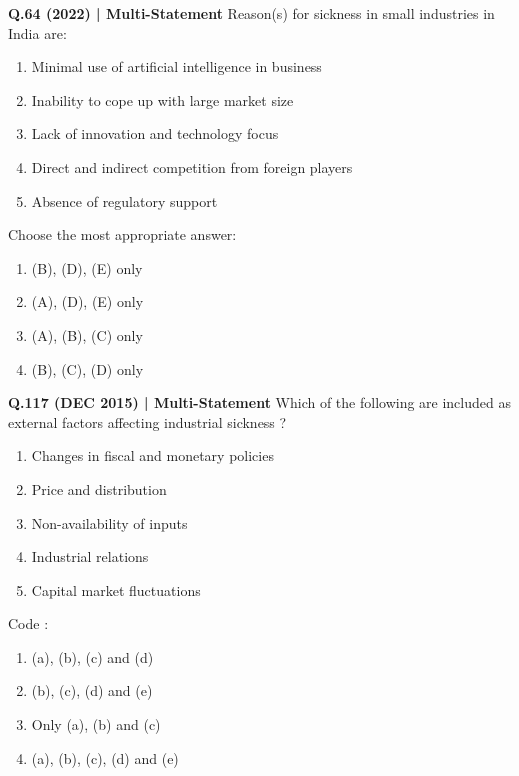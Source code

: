 \documentclass{article}
\begin{document}
\textbf{Q.64 (2022) | Multi-Statement}
Reason(s) for sickness in small industries in India are:
\begin{enumerate}[label=\Alph*.]
    \item Minimal use of artificial intelligence in business
    \item Inability to cope up with large market size
    \item Lack of innovation and technology focus
    \item Direct and indirect competition from foreign players
    \item Absence of regulatory support
\end{enumerate}
Choose the most appropriate answer:
\begin{enumerate}[label=(\arabic*)]
    \item (B), (D), (E) only
    \item (A), (D), (E) only
    \item (A), (B), (C) only
    \item (B), (C), (D) only
\end{enumerate}

\textbf{Q.117 (DEC 2015) | Multi-Statement}
Which of the following are included as external factors affecting industrial sickness ?
\begin{enumerate}[label=(\alph*)]
    \item Changes in fiscal and monetary policies
    \item Price and distribution
    \item Non-availability of inputs
    \item Industrial relations
    \item Capital market fluctuations
\end{enumerate}
Code :
\begin{enumerate}[label=(\arabic*)]
    \item (a), (b), (c) and (d)
    \item (b), (c), (d) and (e)
    \item Only (a), (b) and (c)
    \item (a), (b), (c), (d) and (e)
\end{enumerate}
\end{document}
